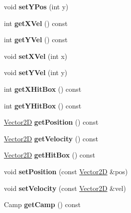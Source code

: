 \begin{DoxyCompactItemize}
\item 
\mbox{\label{class_entity_a66278a362d97e2a30912c2a31962bfb9}} 
void {\bfseries set\+Y\+Pos} (int y)
\item 
\mbox{\label{class_entity_a31c55ae9457507b1c3ad5688b8f2eda2}} 
int {\bfseries get\+X\+Vel} () const
\item 
\mbox{\label{class_entity_abaf01d725e35883d60f1fec3f39a8ea0}} 
int {\bfseries get\+Y\+Vel} () const
\item 
\mbox{\label{class_entity_a7f20a2190046121150e5903ec769e9dc}} 
void {\bfseries set\+X\+Vel} (int x)
\item 
\mbox{\label{class_entity_a9d7c4a35217e6f83ac21da314aa3ec9a}} 
void {\bfseries set\+Y\+Vel} (int y)
\item 
\mbox{\label{class_entity_a5077b09978b28e502737475686ee893d}} 
int {\bfseries get\+X\+Hit\+Box} () const
\item 
\mbox{\label{class_entity_ad46d1d4faf814a6b501101bc1c914754}} 
int {\bfseries get\+Y\+Hit\+Box} () const
\item 
\mbox{\label{class_entity_a6086a606c751be107efdc29109346d32}} 
\hyperlink{structbasic__vector2_d}{Vector2D} {\bfseries get\+Position} () const
\item 
\mbox{\label{class_entity_a3107fab87440ee7e410c4a98505dfc50}} 
\hyperlink{structbasic__vector2_d}{Vector2D} {\bfseries get\+Velocity} () const
\item 
\mbox{\label{class_entity_a4d69956308b0a0396ddba314c0aa0972}} 
\hyperlink{structbasic__vector2_d}{Vector2D} {\bfseries get\+Hit\+Box} () const
\item 
\mbox{\label{class_entity_a372b9155542c8a228a4f1305f5f67341}} 
void {\bfseries set\+Position} (const \hyperlink{structbasic__vector2_d}{Vector2D} \&pos)
\item 
\mbox{\label{class_entity_af41c73b5b2a7e68a7f285b12d0dab9f1}} 
void {\bfseries set\+Velocity} (const \hyperlink{structbasic__vector2_d}{Vector2D} \&vel)
\item 
\mbox{\label{class_entity_a80b1c04df243bcdba1225a10e54995f1}} 
Camp {\bfseries get\+Camp} () const
\end{DoxyCompactItemize}
